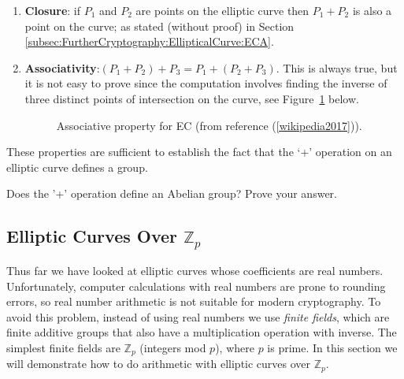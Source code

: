 \begin{enumerate}[1.]
\item \textbf{Closure}: if $P_1$ and $P_2$ are points on the elliptic curve then $P_1 + P_2$ is also a point on the curve; as stated (without proof) in Section \ref{subsec:FurtherCryptography:EllipticalCurve:ECA}.
\item \textbf{Associativity}:$(P_1 + P_2) + P_3 = P_1 + (P_2 + P_3)$. This is always true, but it is not easy to prove since the computation involves finding the inverse of three distinct points of intersection on the curve, see Figure~\ref{fig:DH:DHKE_12} below.
\begin{figure}[H]
	  \caption{\label{fig:DH:DHKE_12} Associative property for EC (from reference (\ref{wikipedia2017})).}
\end{figure}
\end{enumerate}

These properties are sufficient to establish the fact that the `+' operation on an elliptic curve defines a group.

\begin{exercise}{}
Does the '+' operation define an Abelian group? Prove your answer.
\end {exercise}

\subsection{Elliptic Curves Over $\mathbb{Z}_p$} 

Thus far we have looked at elliptic curves whose coefficients are real numbers. Unfortunately, computer calculations with real numbers are prone to rounding errors, so real number arithmetic is not suitable for modern cryptography. To avoid this problem,  instead of using real numbers we use \emph{finite fields}, which are finite additive groups that also have a multiplication operation with inverse. The simplest finite fields are  $\mathbb{Z}_p$ (integers mod $p$),  where $p$ is prime. In this section we will demonstrate how to do arithmetic with elliptic curves over $\mathbb{Z}_p$.

